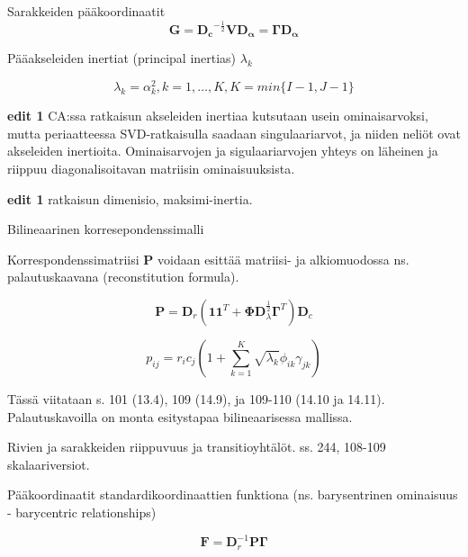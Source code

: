 \documentclass[
  finnish,
]{book}
\begin{document}
Sarakkeiden pääkoordinaatit
\begin{equation}
 \boldsymbol{G}  = \boldsymbol{D_c}^{-\frac{1}{2}} \boldsymbol{V} \boldsymbol{D_{\alpha}} = \boldsymbol{\Gamma}  \boldsymbol{D_{\alpha}}
 \label{eq:sarakeprinc1}
\end{equation}

Pääakseleiden inertiat (principal inertias) \(\lambda_{k}\)

\begin{equation}
\lambda_{k} = \alpha_{k}^2, k = 1,\dots,K,
K = min \{ I-1, J-1 \}
\end{equation}

\textbf{edit 1} CA:ssa ratkaisun akseleiden inertiaa kutsutaan usein ominaisarvoksi,
mutta periaatteessa SVD-ratkaisulla saadaan singulaariarvot, ja niiden neliöt ovat
akseleiden inertioita. Ominaisarvojen ja sigulaariarvojen yhteys on läheinen ja
riippuu diagonalisoitavan matriisin ominaisuuksista.

\textbf{edit 1} ratkaisun dimenisio, maksimi-inertia.

Bilineaarinen korresepondenssimalli

Korrespondenssimatriisi \(\boldsymbol{P}\) voidaan esittää matriisi- ja
alkiomuodossa ns. palautuskaavana (reconstitution formula).

\begin{equation}
\boldsymbol{P} = \boldsymbol{D}_{r} \left( \boldsymbol{1}\boldsymbol{1}^{T} + \boldsymbol{\Phi}\boldsymbol{D}_{\lambda}^{\frac {1}{2}}\boldsymbol{\Gamma}^{T}\right)\boldsymbol{D}_{c}
\label{eq:reconstform1}
\end{equation}

\begin{equation}
p_ {ij}= r_{i}c_{j} \left(1 + \sum_{k=1}^{K} \sqrt{\lambda_{k}} \phi_{ik} \gamma_{jk} \right)
\label{eq:reconstform2}
\end{equation}

Tässä viitataan s. 101 (13.4), 109 (14.9), ja 109-110 (14.10 ja 14.11).
Palautuskavoilla on monta esitystapaa bilineaarisessa mallissa.

Rivien ja sarakkeiden riippuvuus ja transitioyhtälöt. ss. 244, 108-109 skalaariversiot.

Pääkoordinaatit standardikoordinaattien funktiona
(ns. barysentrinen ominaisuus - barycentric relationships)

\begin{equation}
\boldsymbol{F} = \boldsymbol{D}_{r}^{-1} \boldsymbol{P}\boldsymbol{\Gamma}
\label{eq:barysentr1}
\end{equation}
\end{document}
